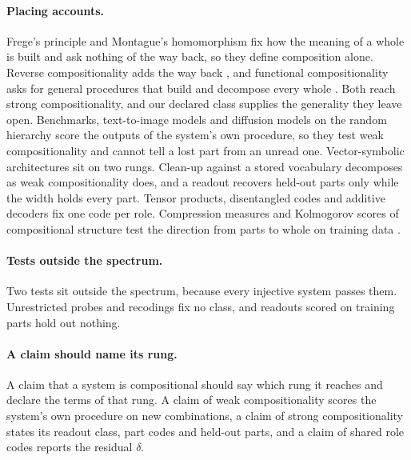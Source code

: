 \paragraph{Placing accounts.} Frege's principle and Montague's homomorphism fix how the meaning of a whole is built and ask nothing of the way back, so they define composition alone. Reverse compositionality adds the way back \citep{fodor2002}, and functional compositionality asks for general procedures that build and decompose every whole \citep{vangelder1990}. Both reach strong compositionality, and our declared class supplies the generality they leave open. Benchmarks, text-to-image models and diffusion models on the random hierarchy score the outputs of the system's own procedure, so they test weak compositionality and cannot tell a lost part from an unread one. Vector-symbolic architectures sit on two rungs. Clean-up against a stored vocabulary decomposes as weak compositionality does, and a readout recovers held-out parts only while the width holds every part. Tensor products, disentangled codes and additive decoders fix one code per role. Compression measures and Kolmogorov scores of compositional structure test the direction from parts to whole on training data \citep{andreas2019,elmoznino2024,elmoznino2026}.

\paragraph{Tests outside the spectrum.} Two tests sit outside the spectrum, because every injective system passes them. Unrestricted probes and recodings fix no class, and readouts scored on training parts hold out nothing.

\paragraph{A claim should name its rung.} A claim that a system is compositional should say which rung it reaches and declare the terms of that rung. A claim of weak compositionality scores the system's own procedure on new combinations, a claim of strong compositionality states its readout class, part codes and held-out parts, and a claim of shared role codes reports the residual $\delta$.

